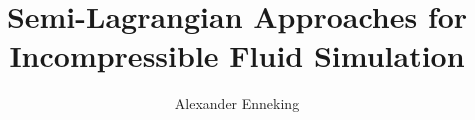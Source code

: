 \documentclass{ACGSeminar}
\begin{document}
\title{Semi-Lagrangian Approaches for Incompressible Fluid Simulation}

\author{Alexander Enneking}

\maketitle


\begin{abstract}%

\end{abstract}

\keywords{ }
\tableofcontents

\end{document}
